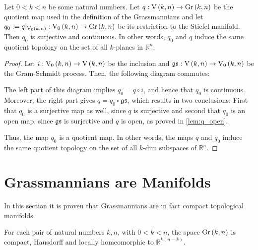 \begin{proposition} Let $0<k<n$ be some natural numbers. Let $q:\St{k}{n}\to\Gr{k}{n}$ be the quotient map used in the definition of the Grassmannians and let $q_0:=q|_{\StO{k}{n}}:\StO{k}{n}\to\Gr{k}{n}$ be its restriction to the Stiefel manifold. Then $q_0$ is surjective and continuous. In other words, $q_0$ and $q$ induce the same quotient topology on the set of all $k$-planes in $\mathbb{R}^n$.
\end{proposition}
\begin{proof}
Let $i:\StO{k}{n}\to\St{k}{n}$ be the inclusion and $\mathfrak{gs}:\St{k}{n}\to\StO{k}{n}$ be the Gram-Schmidt process. Then, the following diagram commutes:
\begin{center}
\end{center}
The left part of this diagram implies $q_0=q\circ i$, and hence that $q_0$ is continuous. Moreover, the right part gives $q=q_0\circ\mathfrak{gs}$, which results in two conclusions: First that $q_0$ is a surjective map as well, since $q$ is surjective and second that $q_0$ is an open map, since $\mathfrak{gs}$ is surjective and $q$ is open, as proved in \ref{lem:q_open}.

Thus, the map $q_0$ is a quotient map. In other words, the maps $q$ and $q_0$ induce the same quotient topology on the set of all $k$-dim subspaces of $\mathbb{R}^n$.
\end{proof}

\section{Grassmannians are Manifolds}
In this section it is proven that Grassmannians are in fact compact topological manifolds.
\begin{lemma}\label{lem:gr_manifold} For each pair of natural numbers $k,n$, with $0<k<n$, the space $\Gr{k}{n}$ is compact, Hausdorff and locally homeomorphic to $\mathbb{R}^{k(n-k)}$.
\end{lemma}

